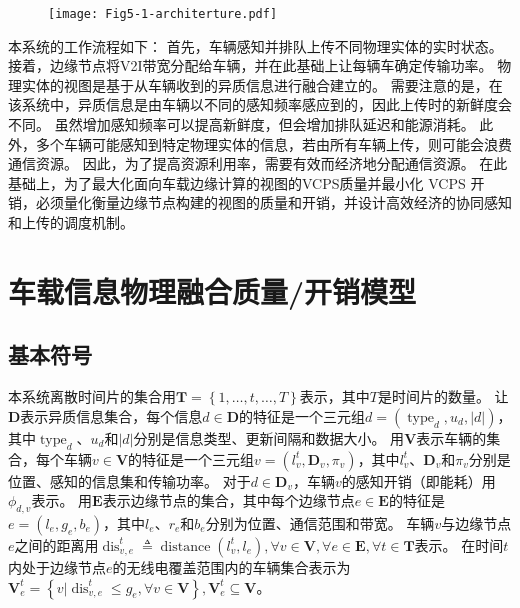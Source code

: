 \begin{figure}[h]
\centering
  \texttt{[image: Fig5-1-architerture.pdf]}
  \label{fig 4-1}
\end{figure} 

本系统的工作流程如下：
首先，车辆感知并排队上传不同物理实体的实时状态。
接着，边缘节点将V2I带宽分配给车辆，并在此基础上让每辆车确定传输功率。
物理实体的视图是基于从车辆收到的异质信息进行融合建立的。
需要注意的是，在该系统中，异质信息是由车辆以不同的感知频率感应到的，因此上传时的新鲜度会不同。
虽然增加感知频率可以提高新鲜度，但会增加排队延迟和能源消耗。
此外，多个车辆可能感知到特定物理实体的信息，若由所有车辆上传，则可能会浪费通信资源。
因此，为了提高资源利用率，需要有效而经济地分配通信资源。
在此基础上，为了最大化面向车载边缘计算的视图的VCPS质量并最小化 VCPS 开销，必须量化衡量边缘节点构建的视图的质量和开销，并设计高效经济的协同感知和上传的调度机制。

\section{车载信息物理融合质量/开销模型}\label{section 4-3}
\subsection{基本符号}
本系统离散时间片的集合用$\mathbf{T}=\left\{1,\ldots,t,\ldots, T \right\}$表示，其中$T$是时间片的数量。
让$\mathbf{D}$表示异质信息集合，每个信息$d \in \mathbf{D}$的特征是一个三元组$d=\left(\operatorname{type}_d, u_d, \left|d\right| \right)$，其中$\operatorname{type}_d$、$u_d$和$\left|d\right|$分别是信息类型、更新间隔和数据大小。
用$\mathbf{V}$表示车辆的集合，每个车辆$v\in \mathbf{V}$的特征是一个三元组$v=\left (l_v^t, \mathbf{D}_v, \pi_v \right )$，其中$l_v^t$、$\mathbf{D}_v$和$\pi_v$分别是位置、感知的信息集和传输功率。
对于$d \in \mathbf{D}_v$，车辆$v$的感知开销（即能耗）用$\phi_{d, v}$表示。
用$\mathbf{E}$表示边缘节点的集合，其中每个边缘节点$e \in \mathbf{E}$的特征是$e=\left (l_e, g_e, b_e \right)$，其中$l_{e}$、$r_{e}$和$b_{e}$分别为位置、通信范围和带宽。
车辆$v$与边缘节点$e$之间的距离用$\operatorname{dis}_{v, e}^t \triangleq \operatorname{distance} \left (l_v^t, l_e \right ), \forall v \in \mathbf{V}, \forall e \in \mathbf{E}, \forall t \in \mathbf{T}$表示。
在时间$t$内处于边缘节点$e$的无线电覆盖范围内的车辆集合表示为$\mathbf{V}_e^t=\left \{v \vert \operatorname{dis}_{v, e}^t \leq g_e, \forall v \in \mathbf{V} \right \}, \mathbf{V}_e^t \subseteq \mathbf{V}$。

